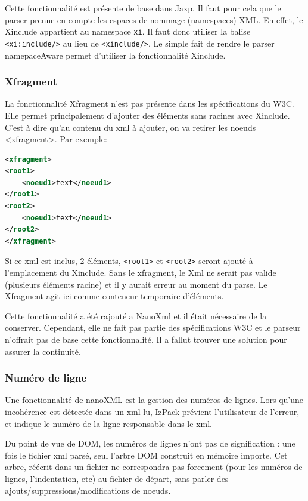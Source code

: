 Cette fonctionnalité est présente de base dans Jaxp.
Il faut pour cela que le parser prenne en compte les espaces de nommage (namespaces) XML.
En effet, le Xinclude appartient au namespace \verb|xi|.
Il faut donc utiliser la balise \verb|<xi:include/>| au lieu de \verb|<xinclude/>|.
Le simple fait de rendre le parser namepaceAware permet d'utiliser la fonctionnalité Xinclude.

\subsubsection{Xfragment}
La fonctionnalité Xfragment n'est pas présente dans les spécifications du W3C.
Elle permet principalement d'ajouter des éléments sans racines avec Xinclude.
C'est à dire qu'au contenu du xml à ajouter, on va retirer les noeuds <xfragment>. Par exemple:
\begin{lstlisting}[language=xml]
<xfragment>
<root1>
	<noeud1>text</noeud1>
</root1>
<root2>
	<noeud1>text</noeud1>
</root2>
</xfragment>
\end{lstlisting}
Si ce xml est inclus, 2 éléments, \verb|<root1>| et \verb|<root2>| seront ajouté à l'emplacement du Xinclude.
Sans le xfragment, le Xml ne serait pas valide (plusieurs éléments racine) et il y aurait erreur au moment du parse.
Le Xfragment agit ici comme conteneur temporaire d'éléments.

Cette fonctionnalité a été rajouté a NanoXml et il était nécessaire de la conserver.
Cependant, elle ne fait pas partie des spécifications W3C et le parseur n'offrait pas de base cette fonctionnalité.
Il a fallut trouver une solution pour assurer la continuité.


\subsubsection{Numéro de ligne}
Une fonctionnalité de nanoXML est la gestion des numéros de lignes. Lors qu'une incohérence est détectée dans un xml lu, IzPack prévient l'utilisateur de l'erreur, et indique le numéro de la ligne responsable dans le xml.

Du point de vue de DOM, les numéros de lignes n'ont pas de signification : une fois le fichier xml parsé, seul l'arbre DOM construit en mémoire importe. Cet arbre, réécrit dans un fichier ne correspondra pas forcement (pour les numéros de lignes, l'indentation, etc) au fichier de départ, sans parler des ajouts/suppressions/modifications de noeuds.

